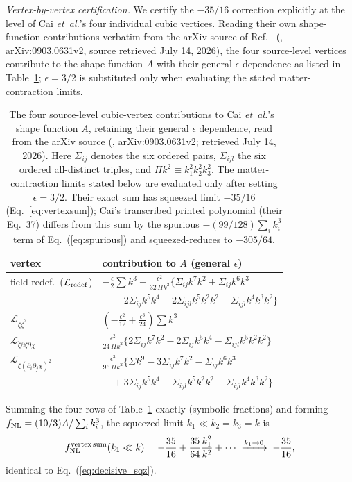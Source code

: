 \documentclass[aps,prd,twocolumn,superscriptaddress,showpacs,preprintnumbers,nofootinbib,longbibliography,floatfix]{revtex4-2}
\newcommand{\fnl}{f_{\rm NL}}
\newcommand{\etal}{\textit{et~al.}}
\begin{document}
\emph{Vertex-by-vertex certification.} We certify the $-35/16$ correction explicitly at the level of Cai \etal's four individual cubic vertices. Reading their own shape-function contributions verbatim from the arXiv source of Ref.~\cite{Cai:2009fn} (, arXiv:0903.0631v2, source retrieved July 14, 2026), the four source-level vertices contribute to the shape function $A$ with their general $\epsilon$ dependence as listed in Table~\ref{tab:vertices}; $\epsilon=3/2$ is substituted only when evaluating the stated matter-contraction limits.
\begin{table}[t]
\centering
\caption{\label{tab:vertices}The four source-level cubic-vertex contributions to Cai \etal's~\cite{Cai:2009fn} shape function $A$, retaining their general $\epsilon$ dependence, read from the arXiv source (\protect{}, arXiv:0903.0631v2; retrieved July 14, 2026). Here $\Sigma_{ij}$ denotes the six ordered pairs, $\Sigma_{ijl}$ the six ordered all-distinct triples, and $\Pi k^2\equiv k_1^2k_2^2k_3^2$. The matter-contraction limits stated below are evaluated only after setting $\epsilon=3/2$. Their exact sum has squeezed limit $-35/16$ (Eq.~\ref{eq:vertexsum}); Cai's transcribed printed polynomial (their Eq.~37) differs from this sum by the spurious $-(99/128)\sum_i k_i^3$ term of Eq.~(\ref{eq:spurious}) and squeezed-reduces to $-305/64$.}
\begin{ruledtabular}
\begin{tabular}{ll}
vertex & contribution to $A$ (general $\epsilon$) \\ \hline
field redef.\ ($\mathcal{L}_{\rm redef}$) & $-\tfrac{\epsilon}{2}\sum k^3 - \tfrac{\epsilon^2}{32\,\Pi k^2}\{\Sigma_{ij}k^7k^2{+}\Sigma_{ij}k^6k^3$ \\
 & $\quad-2\Sigma_{ij}k^5k^4{-}2\Sigma_{ijl}k^5k^2k^2{-}\Sigma_{ijl}k^4k^3k^2\}$ \\
$\mathcal{L}_{\zeta\dot\zeta^2}$ & $\left(-\tfrac{\epsilon^2}{12}+\tfrac{\epsilon^3}{24}\right)\sum k^3$ \\
$\mathcal{L}_{\dot\zeta\partial\zeta\partial\chi}$ & $\tfrac{\epsilon^2}{24\,\Pi k^2}\{2\Sigma_{ij}k^7k^2-2\Sigma_{ij}k^5k^4-\Sigma_{ijl}k^5k^2k^2\}$ \\
$\mathcal{L}_{\zeta(\partial_i\partial_j\chi)^2}$ & $\tfrac{\epsilon^3}{96\,\Pi k^2}\{\Sigma k^9-3\Sigma_{ij}k^7k^2-\Sigma_{ij}k^6k^3$ \\
 & $\quad+3\Sigma_{ij}k^5k^4-\Sigma_{ijl}k^5k^2k^2+\Sigma_{ijl}k^4k^3k^2\}$ \\
\end{tabular}
\end{ruledtabular}
\end{table}
Summing the four rows of Table~\ref{tab:vertices} exactly (symbolic fractions) and forming $\fnl=(10/3)A/\sum_i k_i^3$, the squeezed limit $k_1\ll k_2=k_3=k$ is
\begin{equation}
\fnl^{\rm vertex\,sum}(k_1\ll k) = -\frac{35}{16} + \frac{35}{64}\frac{k_1^2}{k^2} + \cdots \;\xrightarrow{k_1\to0}\; -\frac{35}{16},
\label{eq:vertexsum}
\end{equation}
identical to Eq.~(\ref{eq:decisive_sqz}).
\end{document}
